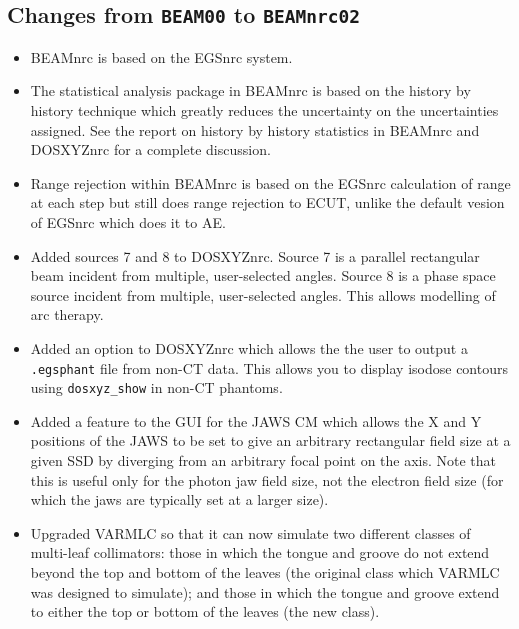 \documentclass[12pt,twoside]{article}
\begin{document}
\subsection{Changes from {\tt BEAM00} to {\tt BEAMnrc02}}

\begin{itemize}

\item BEAMnrc is based on the EGSnrc system.

\item The statistical analysis package in BEAMnrc is based on the history
by history technique which greatly reduces the uncertainty on the
uncertainties assigned. See the report on history by history
statistics in BEAMnrc and DOSXYZnrc \cite{Wa02a} for a complete discussion.

\item Range rejection within BEAMnrc is based on the EGSnrc calculation of
range at each step but still does range rejection to ECUT, unlike the
default vesion of EGSnrc which does it to AE.

\item Added sources 7 and 8 to DOSXYZnrc.  Source 7 is a parallel rectangular
beam incident from multiple, user-selected angles.  Source 8 is a phase
space source incident from multiple, user-selected angles.  This allows
modelling of arc therapy.

\item Added an option to DOSXYZnrc which allows the the user to output a
{\tt .egsphant} file from non-CT data.  This allows you to display isodose
contours using {\tt dosxyz\_show} in non-CT phantoms.

\item Added a feature to the GUI for the JAWS CM which allows the X and Y
positions of the JAWS to be set to give an arbitrary rectangular field size
at a given SSD by diverging from an arbitrary focal point on the axis. Note
that this is useful only for the photon jaw field size, not the electron
field size (for which the jaws are typically set at a larger size).

\item Upgraded VARMLC so that it can now simulate two different classes of
multi-leaf collimators: those in which the tongue and groove do not extend
beyond the top and bottom of the leaves (the original class which VARMLC
was designed to simulate); and those in which the tongue and groove extend
to either the top or bottom of the leaves (the new class).


\end{itemize}
\end{document}
